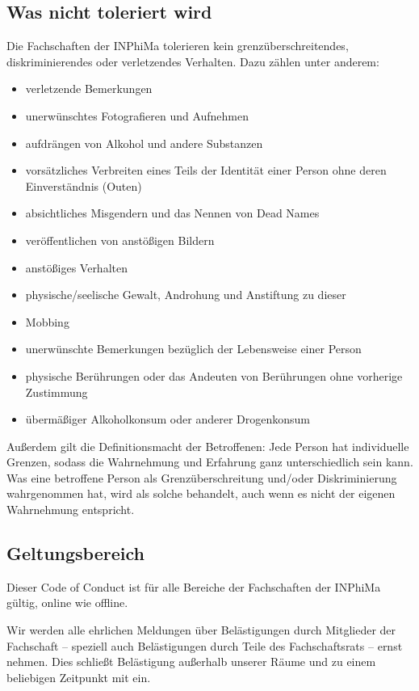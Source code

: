 \documentclass{article}
\begin{document}
\subsection{Was nicht toleriert wird}
Die Fachschaften der INPhiMa tolerieren kein grenzüberschreitendes, diskriminierendes oder verletzendes Verhalten. Dazu zählen unter anderem:
\begin{itemize}
    \item verletzende Bemerkungen
    \item unerwünschtes Fotografieren und Aufnehmen
    \item aufdrängen von Alkohol und andere Substanzen
    \item vorsätzliches Verbreiten eines Teils der Identität einer Person ohne deren Einverständnis (Outen)
    \item absichtliches Misgendern und das Nennen von Dead Names
    \item veröffentlichen von anstößigen Bildern
    \item anstößiges Verhalten
    \item physische/seelische Gewalt, Androhung und Anstiftung zu dieser
    \item Mobbing
    \item unerwünschte Bemerkungen bezüglich der Lebensweise einer Person
    \item physische Berührungen oder das Andeuten von Berührungen ohne vorherige Zustimmung
    \item übermäßiger Alkoholkonsum oder anderer Drogenkonsum
\end{itemize}

Außerdem gilt die Definitionsmacht der Betroffenen: Jede Person hat individuelle Grenzen, sodass die Wahrnehmung und Erfahrung ganz unterschiedlich sein kann. Was eine betroffene Person als Grenzüberschreitung und/oder Diskriminierung wahrgenommen hat, wird als solche behandelt, auch wenn es nicht der eigenen Wahrnehmung entspricht.

\subsection{Geltungsbereich}
Dieser Code of Conduct ist für alle Bereiche der Fachschaften der INPhiMa gültig, online wie offline.

Wir werden alle ehrlichen Meldungen über Belästigungen durch Mitglieder der Fachschaft – speziell auch Belästigungen durch Teile des Fachschaftsrats – ernst nehmen. Dies schließt Belästigung außerhalb unserer Räume und zu einem beliebigen Zeitpunkt mit ein.
\end{document}
